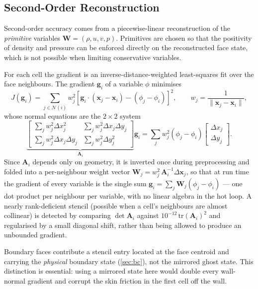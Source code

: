 \subsection{Second-Order Reconstruction}
\label{sec:reconstruction}

Second-order accuracy comes from a piecewise-linear reconstruction of the
\emph{primitive} variables $\mathbf{W}=(\rho,u,v,p)$. Primitives are chosen so
that the positivity of density and pressure can be enforced directly on the
reconstructed face state, which is not possible when limiting conservative
variables.

For each cell the gradient is an inverse-distance-weighted least-squares fit over
the face neighbours. The gradient $\mathbf{g}_i$ of a variable $\phi$ minimises
\begin{equation}
  J(\mathbf{g}_i)=\sum_{j\in\mathcal{N}(i)} w_j^2
  \left[\mathbf{g}_i\!\cdot\!(\mathbf{x}_j-\mathbf{x}_i)-(\phi_j-\phi_i)\right]^2,
  \qquad w_j=\frac{1}{\|\mathbf{x}_j-\mathbf{x}_i\|},
  \label{eq:lsq}
\end{equation}
whose normal equations are the $2\times2$ system
\begin{equation}
  \underbrace{\begin{bmatrix}
    \sum_j w_j^2\Delta x_j^2 & \sum_j w_j^2\Delta x_j\Delta y_j\\
    \sum_j w_j^2\Delta x_j\Delta y_j & \sum_j w_j^2\Delta y_j^2
  \end{bmatrix}}_{\mathbf{A}_i}\mathbf{g}_i
  =\sum_j w_j^2 (\phi_j-\phi_i)
  \begin{bmatrix}\Delta x_j\\ \Delta y_j\end{bmatrix} .
  \label{eq:normaleq}
\end{equation}
Since $\mathbf{A}_i$ depends only on geometry, it is inverted once during
preprocessing and folded into a per-neighbour weight vector
$\mathbf{W}_j=w_j^2\,\mathbf{A}_i^{-1}\Delta\mathbf{x}_j$, so that at run time
the gradient of every variable is the single sum
$\mathbf{g}_i=\sum_j \mathbf{W}_j(\phi_j-\phi_i)$ --- one dot product per
neighbour per variable, with no linear algebra in the hot loop. A nearly
rank-deficient stencil (possible when a cell's neighbours are almost collinear)
is detected by comparing $\det\mathbf{A}_i$ against
$10^{-12}\,\mathrm{tr}(\mathbf{A}_i)^2$ and regularised by a small diagonal
shift, rather than being allowed to produce an unbounded gradient.

Boundary faces contribute a stencil entry located at the face centroid and
carrying the \emph{physical} boundary state (\cref{sec:bc}), not the mirrored
ghost state. This distinction is essential: using a mirrored state here would
double every wall-normal gradient and corrupt the skin friction in the first cell
off the wall.

